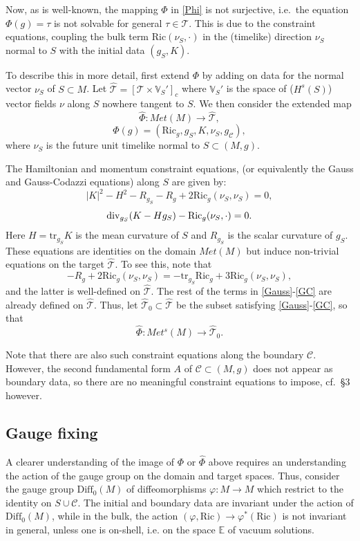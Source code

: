 \documentclass[10pt]{amsart}
\newcommand{\f}{\varphi}
\newcommand{\cC}{{\mathcal C}}
\newcommand{\cT}{{\mathcal T}}
\newcommand{\bE}{\mathbb E}
\newcommand{\bV}{\mathbb V}
\newcommand{\Diff}{\mathrm{Diff}}
\newcommand{\Ric}{\mathrm{Ric}}
\newcommand{\be}{\begin{equation}}
\newcommand{\ee}{\end{equation}}
\newcommand{\tr}{\mathrm{tr}}
\renewcommand{\to}{\rightarrow}
\renewcommand{\hat}{\widehat}
\newcommand{\<}{\langle}
\renewcommand{\>}{\rangle}
\theoremstyle{plain}
\theoremstyle{remark}
\theoremstyle{definition}
\numberwithin{equation}{section}
\begin{document}
  Now, as is well-known, the mapping $\Phi$ in \eqref{Phi} is not surjective, i.e.~the equation $\Phi(g) = \tau$ is not solvable for general 
$\tau \in \cT$. This is due to the constraint equations, coupling the bulk term $\Ric(\nu_S, \cdot)$ in the (timelike) direction $\nu_S$ normal 
to $S$ with the initial data $(g_S, K)$. 

  To describe this in more detail, first extend $\Phi$ by adding on data for the normal vector $\nu_S$ of $S \subset M$. Let $\hat \cT = [\cT \times \bV_S']_c$ 
where $\bV_S'$ is the space of ($H^s(S)$) vector fields $\nu$ along $S$ nowhere tangent to $S$. We then consider the extended map 
\be \label{hatPhi}
\hat \Phi: Met(M)  \to \hat \cT,
\ee
$$\Phi(g) = (\Ric_g, g_S, K, \nu_S, g_{\cC}),$$
where $\nu_S$ is the future unit timelike normal to $S \subset (M, g)$. 
 
  The Hamiltonian and momentum constraint equations, (or equivalently the Gauss and Gauss-Codazzi equations) along $S$ are given by: 
\be \label{Gauss}
|K|^2 - H^2 - R_{g_S} - R_g + 2\Ric_g(\nu_S,\nu_S) = 0,
\ee
\be \label{GC} 
{\rm div}_{g_S} (K - H g_S) - \Ric_g(\nu_S, \cdot) = 0. 
\ee 
Here $H = \tr_{g_S}K$ is the mean curvature of $S$ and $R_{g_S}$ is the scalar curvature of $g_S$. These equations are identities on the domain 
$Met(M)$ but induce non-trivial equations on the target $\hat \cT$. To see this, note that 
$$- R_g + 2\Ric_g(\nu_S,\nu_S) = -\tr_{g_S}\Ric_g + 3\Ric_g(\nu_S, \nu_S),$$
and the latter is well-defined on $\hat \cT$. The rest of the terms in \eqref{Gauss}-\eqref{GC} are already defined on $\hat \cT$. Thus, let 
$\hat \cT_0 \subset \hat \cT$ be the subset satisfying \eqref{Gauss}-\eqref{GC}, so that 
\be \label{hatPhi}
\hat \Phi: Met^s(M)  \to \hat \cT_0.
\ee

  Note that there are also such constraint equations along the boundary $\cC$. However, the second fundamental form $A$ of $\cC \subset (M, g)$ does 
not appear as boundary data, so there are no meaningful constraint equations to impose, cf.~\S 3 however. 


\subsection{Gauge fixing}

A clearer understanding of the image of $\Phi$ or $\hat \Phi$ above requires an understanding the action of the gauge group on the domain and target 
spaces. Thus, consider the gauge group $\Diff_0(M)$ of diffeomorphisms $\f: M \to M$ which restrict to the identity on $S\cup \cC$. The initial and boundary 
data are invariant under the action of $\Diff_0(M)$, while in the bulk, the action $(\f, \Ric) \to \f^*(\Ric)$ is not invariant in general, unless one is on-shell, 
i.e. on the space $\bE$ of vacuum solutions. 
\end{document}
